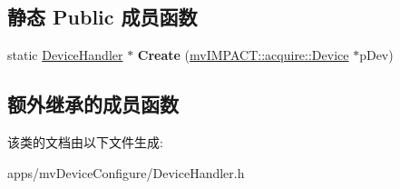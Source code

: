 \subsection*{静态 Public 成员函数}
\begin{DoxyCompactItemize}
\item 
\hypertarget{class_device_handler3rd_party_a6d81836ef750a55e63cb3a9f19ae8cf5}{static \hyperlink{class_device_handler}{Device\+Handler} $\ast$ {\bfseries Create} (\hyperlink{classmv_i_m_p_a_c_t_1_1acquire_1_1_device}{mv\+I\+M\+P\+A\+C\+T\+::acquire\+::\+Device} $\ast$p\+Dev)}\label{class_device_handler3rd_party_a6d81836ef750a55e63cb3a9f19ae8cf5}

\end{DoxyCompactItemize}
\subsection*{额外继承的成员函数}


该类的文档由以下文件生成\+:\begin{DoxyCompactItemize}
\item 
apps/mv\+Device\+Configure/Device\+Handler.\+h\end{DoxyCompactItemize}

